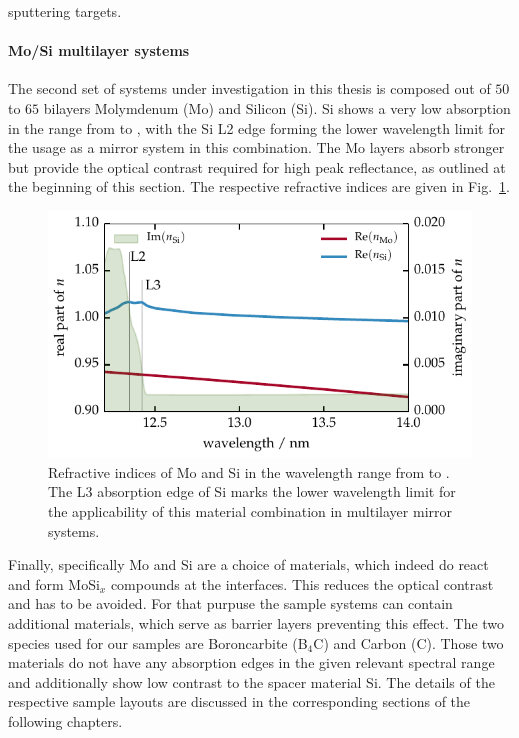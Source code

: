 sputtering targets. 


\paragraph{Mo/Si multilayer systems}
The second set of systems under investigation in this thesis is composed out of $50$ to $65$ bilayers Molymdenum (Mo) and Silicon (Si). Si shows a very low absorption in the range from  to , with the Si L2 edge forming the lower wavelength limit for the usage as a mirror system in this combination. The Mo layers absorb stronger but provide the optical contrast required for high peak reflectance, as outlined at the beginning of this section. The respective refractive indices are given in Fig.~\ref{ch_exp:fig_mosi_contrast}.
\begin{figure}[htb]
        \includegraphics{img/Mo_Si_contrast}
        \caption[Refractive indices of Mo and Si in the wavelength range from  to .]{%
            Refractive indices of Mo and Si in the wavelength range from  to . The L3 absorption edge of Si marks the lower wavelength limit for the applicability of this material combination in multilayer mirror systems.}
        \label{ch_exp:fig_mosi_contrast}
\end{figure}

Finally, specifically Mo and Si are a choice of materials, which indeed do react and form MoSi$_x$ compounds at the interfaces. This reduces the optical contrast and has to be avoided. For that purpuse the sample systems can contain additional materials, which serve as barrier layers preventing this effect. The two species used for our samples are Boroncarbite (B$_4$C) and Carbon (C). Those two materials do not have any absorption edges in the given relevant spectral range and additionally show low contrast to the spacer material Si. The details of the respective sample layouts are discussed in the corresponding sections of the following chapters.

